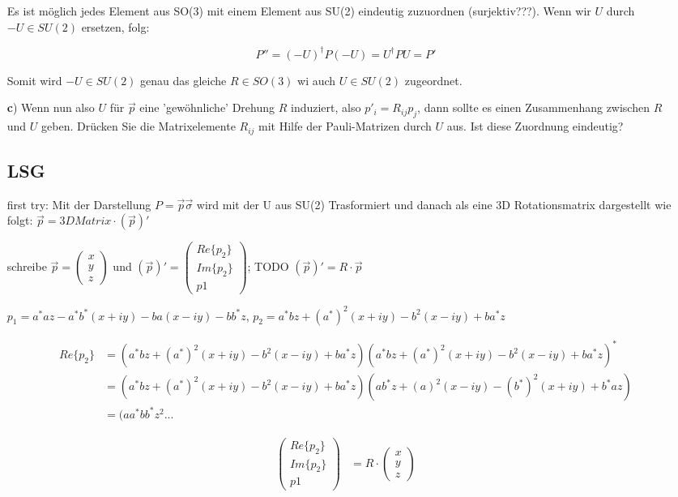 \begin{enumerate}
Es ist möglich jedes Element aus SO(3) mit einem Element aus SU(2) eindeutig zuzuordnen (surjektiv???). Wenn wir \(U\) durch \(-U\in SU(2)\) ersetzen, folg:

\[P'' = (-U)^\dagger P(-U) = U^\dagger P U = P'\]

Somit wird \(-U\in SU(2)\) genau das gleiche \(R\in SO(3)\) wi auch \(U\in SU(2)\) zugeordnet.





\item[\textbf{c})] Wenn nun also \(U\) für \(\vec p\) eine 'gewöhnliche' Drehung \(R\) induziert, also \(p'_i = R_{ij}p_j\), dann sollte es einen Zusammenhang zwischen \(R\) und \(U\) geben. Drücken Sie die Matrixelemente \(R_{ij}\) mit Hilfe der Pauli-Matrizen durch \(U\) aus. Ist diese Zuordnung eindeutig?

\subsection*{LSG}

first try:
Mit der Darstellung \(P=\vec p \vec \sigma\) wird mit der U aus SU(2) Trasformiert und danach als eine 3D Rotationsmatrix dargestellt wie folgt: \(\vec p = 3DMatrix \cdot (\vec p)'\) 

schreibe \(\vec p =\begin{pmatrix}x\\y\\z\end{pmatrix}\) und \((\vec p)'=\begin{pmatrix}Re\{p_2\}\\Im\{p_2\}\\p1\end{pmatrix}\); TODO \((\vec p)' = R\cdot \vec p\)

\(p_1= a^*az-a^*b^*(x+iy)-ba(x-iy)-bb^*z\),
\(p_2 = a^*bz+(a^*)^2(x+iy)-b^2(x-iy)+ba^*z\)

\begin{align}
Re\{p_2\} &= (a^*bz+(a^*)^2(x+iy)-b^2(x-iy)+ba^*z)(a^*bz+(a^*)^2(x+iy)-b^2(x-iy)+ba^*z)^*\\
&=(a^*bz+(a^*)^2(x+iy)-b^2(x-iy)+ba^*z)(ab^*z+(a)^2(x-iy)-(b^*)^2(x+iy)+b^*az)\\
&=(aa^*bb^*z^2...
\end{align}



\begin{align}
\begin{pmatrix}Re\{p_2\}\\Im\{p_2\}\\p1\end{pmatrix} &= R\cdot \begin{pmatrix}x\\y\\z\end{pmatrix} \\
\end{align} 


\end{enumerate}
